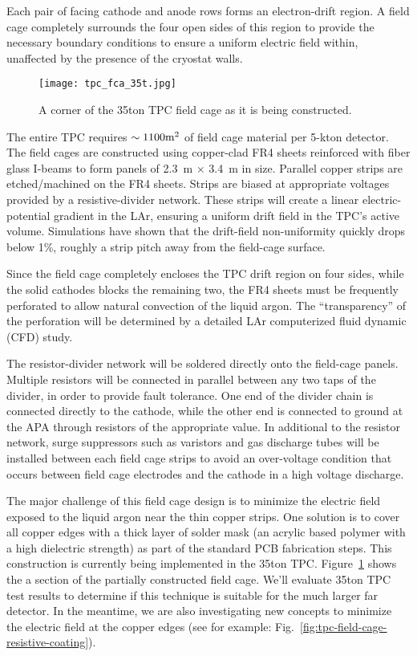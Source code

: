 Each pair of facing cathode and anode rows forms an electron-drift region. A field cage  completely surrounds the four open sides of this region
to provide the necessary boundary conditions to ensure a uniform electric field within, unaffected by the presence of the cryostat walls.

\begin{figure}[htbp]
\centering
\texttt{[image: tpc\_fca\_35t.jpg]}
\caption[35ton field cage]{A corner of the 35ton TPC field cage as it is being constructed. }
\label{fig:tpc-field-cage}
\end{figure}    

The entire TPC requires $\sim 1100 \rm{m}^2$ of field 
cage material per 5-kton detector. The field cages are constructed using copper-clad FR4 sheets reinforced with fiber glass I-beams to form panels of 2.3~m $\times$ 3.4~m in size. Parallel copper strips are etched/machined
on the FR4 sheets. Strips are 
biased at appropriate voltages provided by a resistive-divider network. These strips will create
a linear electric-potential gradient in the LAr, ensuring a uniform drift 
field in the TPC's active volume.  Simulations have shown that the drift-field non-uniformity quickly drops below 1\%, roughly 
a strip pitch away from the field-cage surface. 

Since the field cage completely encloses the TPC drift region on four sides, while the solid cathodes blocks the remaining two, the FR4 sheets must 
be frequently perforated to allow natural convection of the liquid argon.  
The ``transparency'' of the perforation will be determined by a 
detailed LAr computerized fluid dynamic (CFD) study.


The resistor-divider network will be soldered directly onto the field-cage panels. 
Multiple resistors will be connected in parallel between any two taps of the divider,
in order to provide fault tolerance. 
One end of the divider chain is connected directly to the cathode, while the other end is connected to ground at the APA through resistors of the appropriate value. 
In additional to the resistor network, surge suppressors such as varistors and gas discharge tubes will be installed between each field cage strips to avoid an over-voltage condition that occurs between field cage electrodes and the cathode in a high voltage discharge.


The major challenge of this field cage design is to minimize the electric field exposed to the liquid argon near the thin copper strips.  One solution is to cover all copper edges with a thick layer of solder mask (an acrylic based polymer with a high dielectric strength) as part of the standard PCB fabrication steps.  This construction is currently being implemented in the 35ton TPC.  Figure~\ref{fig:tpc-field-cage} shows 
the a section of the partially constructed field cage.  We'll evaluate 35ton TPC test results to determine if this technique is suitable for the much larger far detector.  In the meantime, we are also investigating new concepts to minimize the electric field at the copper edges (see for example: Fig.~\ref{fig:tpc-field-cage-resistive-coating}).

